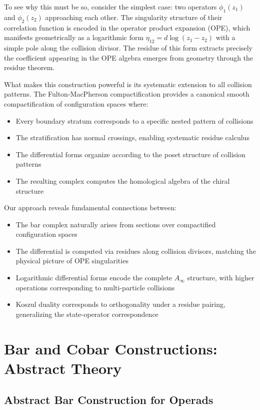 To see why this must be so, consider the simplest case: two operators $\phi_1(z_1)$ and $\phi_2(z_2)$ approaching each other. The singularity structure of their correlation function is encoded in the operator product expansion (OPE), which manifests geometrically as a logarithmic form $\eta_{12} = d\log(z_1 - z_2)$ with a simple pole along the collision divisor. The residue of this form extracts precisely the coefficient appearing in the OPE algebra emerges from geometry through the residue theorem.

What makes this construction powerful is its systematic extension to all collision patterns. The Fulton-MacPherson compactification provides a canonical smooth compactification of configuration spaces where:
\begin{itemize}
\item Every boundary stratum corresponds to a specific nested pattern of collisions
\item The stratification has normal crossings, enabling systematic residue calculus
\item The differential forms organize according to the poset structure of collision patterns
\item The resulting complex computes the homological algebra of the chiral structure
\end{itemize}


Our approach reveals fundamental connections between:
\begin{itemize}
\item The bar complex naturally arises from sections over compactified configuration spaces
\item The differential is computed via residues along collision divisors, matching the physical picture of OPE singularities
\item Logarithmic differential forms encode the complete $A_\infty$ structure, with higher operations corresponding to multi-particle collisions
\item Koszul duality corresponds to orthogonality under a residue pairing, generalizing the state-operator correspondence
\end{itemize}

\section{Bar and Cobar Constructions: Abstract Theory}

\subsection{Abstract Bar Construction for Operads}

